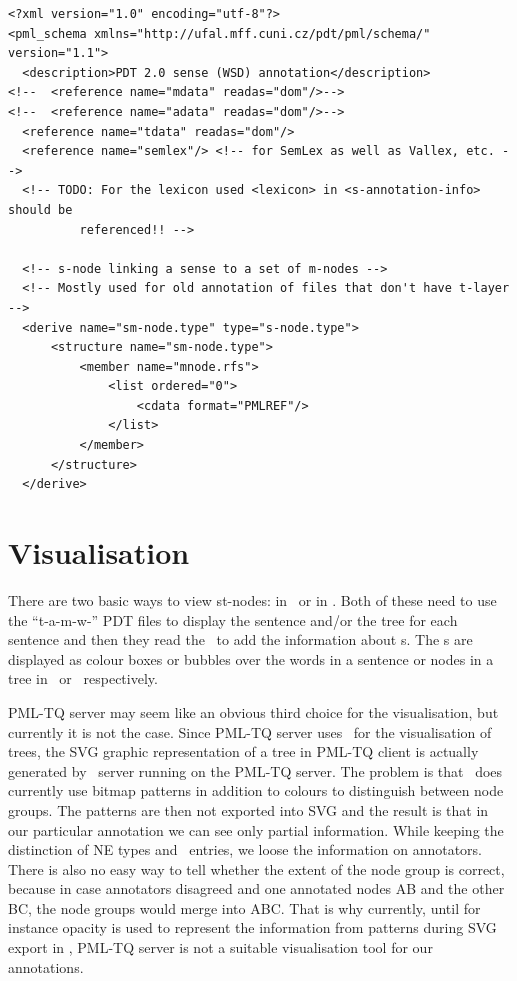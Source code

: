 \begin{lstlisting}[float,caption=\sdata\ PML schema] 
<?xml version="1.0" encoding="utf-8"?>
<pml_schema xmlns="http://ufal.mff.cuni.cz/pdt/pml/schema/" version="1.1">
  <description>PDT 2.0 sense (WSD) annotation</description>
<!--  <reference name="mdata" readas="dom"/>-->
<!--  <reference name="adata" readas="dom"/>-->
  <reference name="tdata" readas="dom"/>
  <reference name="semlex"/> <!-- for SemLex as well as Vallex, etc. -->
  <!-- TODO: For the lexicon used <lexicon> in <s-annotation-info> should be
          referenced!! -->

  <!-- s-node linking a sense to a set of m-nodes -->
  <!-- Mostly used for old annotation of files that don't have t-layer --> 
  <derive name="sm-node.type" type="s-node.type">
      <structure name="sm-node.type">
          <member name="mnode.rfs">
              <list ordered="0">
                  <cdata format="PMLREF"/>
              </list>
          </member> 
      </structure>
  </derive>
\end{lstlisting}

\section{Visualisation}
\label{sec:s:visual}
There are two basic ways to view st-nodes: in \seman\ or in \tred. Both of these need to use the ``t-a-m-w-'' PDT files to display the sentence and/or the tree for each sentence and then they read the \stf\ to add the information about \stn{}s. The \stn{}s are displayed as colour boxes or bubbles over the words in a sentence or nodes in a tree in \seman\ or \tred\ respectively.

PML-TQ server may seem like an obvious third choice for the visualisation, but currently it is not the case. Since PML-TQ server uses \tred\ for the visualisation of trees, the SVG graphic representation of a tree in PML-TQ client is actually generated by \btred\ server running on the PML-TQ server. The problem is that \tred\ does  currently use bitmap patterns in addition to colours to distinguish between node groups. The patterns are then not exported into SVG and the result is that in our particular annotation we can see only partial information. While keeping the distinction of NE types and \semlex\ entries, we loose the information on annotators. There is also no easy way to tell whether the extent of the node group is correct, because in case annotators disagreed and one annotated nodes AB and the other BC, the node groups would merge into ABC. That is why currently, until for instance opacity is used to represent the information from patterns during SVG export in \tred, PML-TQ server is not a suitable visualisation tool for our annotations. 


